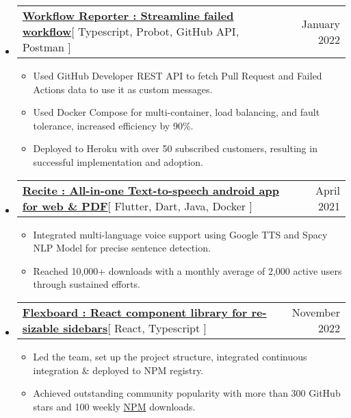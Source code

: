 \documentclass[letterpaper,11pt]{article}
\makeatletter
\newcommand{\resumeItem}[1]{
  \item\small{
    {#1 \vspace{-2pt}}
  }
}
\newcommand{\resumeProjectHeading}[2]{
    \item
    \begin{tabular*}{0.97\textwidth}{l@{\extracolsep{\fill}}r}
      \small#1 & #2 \\
    \end{tabular*}\vspace{-7pt}
}
\newcommand{\resumeSubHeadingListStart}{\begin{itemize}[leftmargin=0.15in, label={}]}
\newcommand{\resumeSubHeadingListEnd}{\end{itemize}}
\newcommand{\resumeItemListStart}{\begin{itemize}}
\newcommand{\resumeItemListEnd}{\end{itemize}\vspace{-5pt}}
\makeatother
\begin{document}
    \resumeSubHeadingListStart
      \resumeProjectHeading
          {\textbf{\href{https://github.com/marketplace/workflow-reporter}{Workflow Reporter : Streamline failed workflow}}{[ Typescript, Probot, GitHub API, Postman ]}}{January 2022}
          \resumeItemListStart
           \resumeItem{Used GitHub Developer REST API to fetch Pull Request and Failed Actions data to use it as custom messages.}
           \resumeItem{Used Docker Compose for multi-container, load balancing, and fault tolerance, increased efficiency by 90\%.}
           \resumeItem{Deployed to Heroku with over 50 subscribed customers, resulting in successful implementation and adoption.}
          \resumeItemListEnd
    \resumeSubHeadingListEnd


    \resumeSubHeadingListStart
      \resumeProjectHeading
          {\textbf{\href{https://play.google.com/store/apps/details?id=com.hackthedeveloper.recite}{Recite : All-in-one Text-to-speech android app for web \& PDF}}{[ Flutter, Dart, Java, Docker ]}}{April 2021}
          \resumeItemListStart
           \resumeItem{Integrated multi-language voice support using Google TTS and Spacy NLP Model for precise sentence detection.}
           \resumeItem{Reached 10,000+ downloads with a monthly average of 2,000 active users through sustained efforts.}
          \resumeItemListEnd
    \resumeSubHeadingListEnd

    \resumeSubHeadingListStart
      \resumeProjectHeading
          {\textbf{\href{https://github.com/dorbus/flexboard}{Flexboard : React component library for re-sizable sidebars}}{[ React, Typescript ]}}{November 2022}
          \resumeItemListStart
            \resumeItem{Led the team, set up the project structure, integrated continuous integration \& deployed to NPM registry.}
            \resumeItem{Achieved outstanding community popularity with more than 300 GitHub stars and 100 weekly \href{https://www.npmjs.com/package/@dorbus/flexboard}{NPM} downloads.}
          \resumeItemListEnd
    \resumeSubHeadingListEnd
\end{document}
